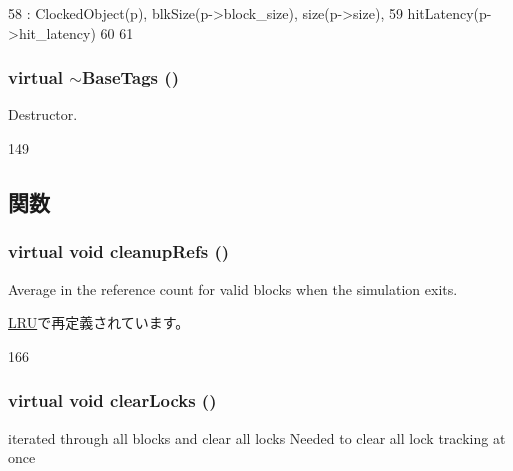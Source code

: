 \begin{DoxyCode}
58     : ClockedObject(p), blkSize(p->block_size), size(p->size),
59       hitLatency(p->hit_latency)
60 {
61 }
\end{DoxyCode}
\hypertarget{classBaseTags_a7d9b66bfc94aa6dbafa003da3e751a8d}{
\subsubsection[{$\sim$BaseTags}]{\setlength{\rightskip}{0pt plus 5cm}virtual $\sim${\bf BaseTags} ()}}
\label{classBaseTags_a7d9b66bfc94aa6dbafa003da3e751a8d}
Destructor. 


\begin{DoxyCode}
149 {}
\end{DoxyCode}


\subsection{関数}
\hypertarget{classBaseTags_aab539ffaf653a007b5326b2042dc8e86}{
\subsubsection[{cleanupRefs}]{\setlength{\rightskip}{0pt plus 5cm}virtual void cleanupRefs ()}}
\label{classBaseTags_aab539ffaf653a007b5326b2042dc8e86}
Average in the reference count for valid blocks when the simulation exits. 

\hyperlink{classLRU_a1acd4c03e94e57919f1254cc4fa0b059}{LRU}で再定義されています。


\begin{DoxyCode}
166 {}
\end{DoxyCode}
\hypertarget{classBaseTags_a9f3e3b80f263780be72db8b9dc53680e}{
\subsubsection[{clearLocks}]{\setlength{\rightskip}{0pt plus 5cm}virtual void clearLocks ()}}
\label{classBaseTags_a9f3e3b80f263780be72db8b9dc53680e}
iterated through all blocks and clear all locks Needed to clear all lock tracking at once 

